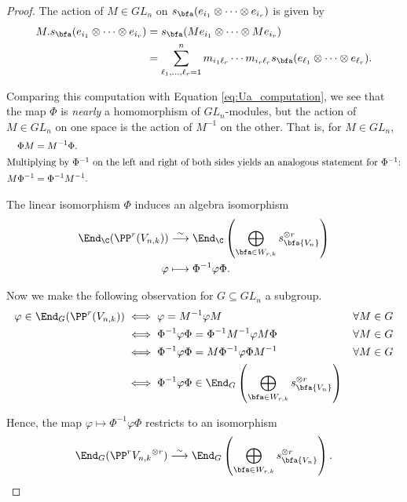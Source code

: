 \begin{proof}
The action of $M\in GL_n$ on $s_\bfa(e_{i_1}\otimes\dots\otimes e_{i_r})$ is given by \begin{align*}
    M.s_\bfa(e_{i_1}\otimes\dots\otimes e_{i_r})&=s_\bfa(Me_{i_1}\otimes\dots\otimes M e_{i_r})\\
    &=\sum_{\ell_1,\dots,\ell_r=1}^n m_{i_1\ell_r}\cdots m_{i_r\ell_r}s_\bfa(e_{\ell_1}\otimes\dots\otimes e_{\ell_r}).
\end{align*}

Comparing this computation with Equation \ref{eq:Ua_computation}, we see that the map $\Phi$ is \textit{nearly} a homomorphism of $GL_n$-modules, but the action of $M\in GL_n$ on one space is the action of $M^{-1}$ on the other. That is, for $M\in GL_n$, \begin{align*}
        \Phi M &= M^{-1}\Phi.\\
        \intertext{Multiplying by $\Phi^{-1}$ on the left and right of both sides yields an analogous statement for $\Phi^{-1}$:}
        M\Phi^{-1}&=\Phi^{-1}M^{-1}.
    \end{align*}


    The linear isomorphism $\Phi$ induces an algebra isomorphism \begin{align*}
        \End_\C(\PP^r(V_{n,k}))&\stackrel{\sim}{\longrightarrow}\End_\C\left(\bigoplus_{\bfa\in W_{r,k}}s_\bfa{V_n}^{\otimes r}\right)\\
        \varphi&\longmapsto \Phi^{-1}\varphi\Phi.
    \end{align*}
    
     Now we make the following observation for $G\subseteq GL_n$ a subgroup. \begin{align*}
        \varphi\in\End_G(\PP^r(V_{n,k}))&\iff \varphi=M^{-1}\varphi M && \forall M\in G\\
        &\iff \Phi^{-1}\varphi\Phi=\Phi^{-1} M^{-1} \varphi M \Phi && \forall M\in G\\
        &\iff \Phi^{-1}\varphi\Phi=M\Phi^{-1}\varphi\Phi M^{-1} && \forall M\in G\\
        &\iff \Phi^{-1}\varphi\Phi\in\End_G\left(\bigoplus_{\bfa\in W_{r,k}}s_\bfa{V_n}^{\otimes r}\right)
    \end{align*}

    Hence, the map $\varphi\mapsto \Phi^{-1}\varphi\Phi$ restricts to an isomorphism\[\End_G(\PP^r{V_{n,k}}^{\otimes r})\stackrel{\sim}{\longrightarrow}\End_G\left(\bigoplus_{\bfa\in W_{r,k}}s_\bfa {V_n}^{\otimes r}\right). \qedhere\]
\end{proof}

